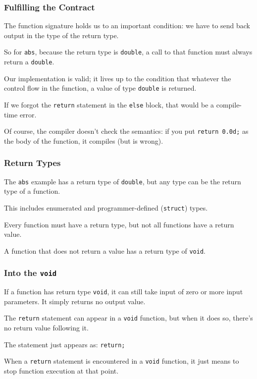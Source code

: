 \begin{frame}
\frametitle{Fulfilling the Contract}

The function signature holds us to an important condition: we have to send back output in the type of the return type.

So for \texttt{abs}, because the return type is \texttt{double}, a call to that function must always return a \texttt{double}.


Our implementation is valid; it lives up to the condition that whatever the control flow in the function, a value of type \texttt{double} is returned.

If we forgot the \texttt{return} statement in the \texttt{else} block, that would be a compile-time error.

Of course, the compiler doesn't check the semantics: if you put \texttt{return 0.0d;} as the body of the function, it compiles (but is wrong).

\end{frame}

\begin{frame}
\frametitle{Return Types}
The \texttt{abs} example has a return type of \texttt{double}, but any type can be the return type of a function.

This includes enumerated and programmer-defined (\texttt{struct}) types.

Every function must have a return type, but not all functions have a return value.

A function that does not return a value has a return type of \texttt{void}.

\end{frame}

\begin{frame}
\frametitle{Into the \texttt{void}}
If a function has return type \texttt{void}, it can still take input of zero or more input parameters. It simply returns no output value.

The \texttt{return} statement can appear in a \texttt{void} function, but when it does so, there's no return value following it.

The statement just appears as: \texttt{return;}

When a \texttt{return} statement is encountered in a \texttt{void} function, it just means to stop function execution at that point.

\end{frame}

